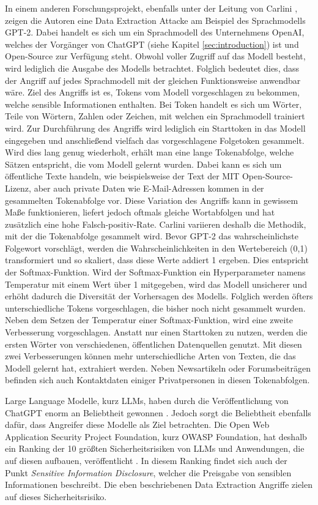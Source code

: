In einem anderen Forschungsprojekt, ebenfalls unter der Leitung von Carlini \cite{P-88}, zeigen die Autoren eine Data Extraction Attacke am Beispiel des Sprachmodells GPT-2. 
Dabei handelt es sich um ein Sprachmodell des Unternehmens OpenAI, welches der Vorgänger von ChatGPT (siehe Kapitel \ref{sec:introduction}) ist und Open-Source zur Verfügung steht.
Obwohl voller Zugriff auf das Modell besteht, wird lediglich die Ausgabe des Modells betrachtet. 
Folglich bedeutet dies, dass der Angriff auf jedes Sprachmodell mit der gleichen Funktionsweise anwendbar wäre.
Ziel des Angriffs ist es, Tokens vom Modell vorgeschlagen zu bekommen, welche sensible Informationen enthalten.
Bei Token handelt es sich um Wörter, Teile von Wörtern, Zahlen oder Zeichen, mit welchen ein Sprachmodell trainiert wird.
Zur Durchführung des Angriffs wird lediglich ein Starttoken in das Modell eingegeben und anschließend vielfach das vorgeschlagene Folgetoken gesammelt. 
Wird dies lang genug wiederholt, erhält man eine lange Tokenabfolge, welche Sätzen entspricht, die vom Modell gelernt wurden. 
Dabei kann es sich um öffentliche Texte handeln, wie beispielsweise der Text der MIT Open-Source-Lizenz, aber auch private Daten wie E-Mail-Adressen kommen in der gesammelten Tokenabfolge vor.
Diese Variation des Angriffs kann in gewissem Maße funktionieren, liefert jedoch oftmals gleiche Wortabfolgen und hat zusätzlich eine hohe Falsch-positiv-Rate.
Carlini \etal \cite{P-88} variieren deshalb die Methodik, mit der die Tokenabfolge gesammelt wird.
Bevor GPT-2 das wahrscheinlichste Folgewort vorschlägt, werden die Wahrscheinlichkeiten in den Wertebereich (0,1) transformiert und so skaliert, dass diese Werte addiert 1 ergeben.
Dies entspricht der Softmax-Funktion.
Wird der Softmax-Funktion ein Hyperparameter namens Temperatur mit einem Wert über 1 mitgegeben, wird das Modell unsicherer und erhöht dadurch die Diversität der Vorhersagen des Modells.
Folglich werden öfters unterschiedliche Tokens vorgeschlagen, die bisher noch nicht gesammelt wurden.
Neben dem Setzen der Temperatur einer Softmax-Funktion, wird eine zweite Verbesserung vorgeschlagen. 
Anstatt nur einen Starttoken zu nutzen, werden die ersten Wörter von verschiedenen, öffentlichen Datenquellen genutzt.
Mit diesen zwei Verbesserungen können mehr unterschiedliche Arten von Texten, die das Modell gelernt hat, extrahiert werden. 
Neben Newsartikeln oder Forumsbeiträgen befinden sich auch Kontaktdaten einiger Privatpersonen in diesen Tokenabfolgen.

Large Language Modelle, kurz LLMs, haben durch die Veröffentlichung von ChatGPT enorm an Beliebtheit gewonnen \cite{I-1}. 
Jedoch sorgt die Beliebtheit ebenfalls dafür, dass Angreifer diese Modelle als Ziel betrachten.
Die Open Web Application Security Project Foundation, kurz OWASP Foundation, hat deshalb ein Ranking der 10 größten Sicherheitsrisiken von LLMs und Anwendungen, die auf diesen aufbauen, veröffentlicht \cite{owasp_llm}.
In diesem Ranking findet sich auch der Punkt \dq\textit{Sensitive Information Disclosure}\dq, welcher die Preisgabe von sensiblen Informationen beschreibt.
Die eben beschriebenen Data Extraction Angriffe zielen auf dieses Sicherheitsrisiko.
